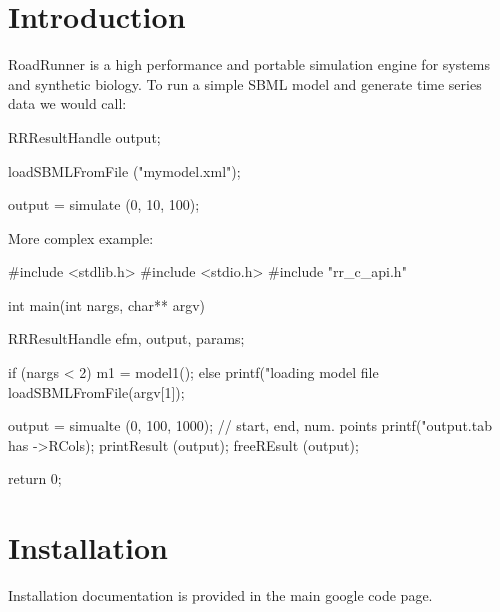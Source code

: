 \hypertarget{index_intro_sec}{}\section{\-Introduction}\label{index_intro_sec}
\-Road\-Runner is a high performance and portable simulation engine for systems and synthetic biology. \-To run a simple \-S\-B\-M\-L model and generate time series data we would call\-:


\begin{DoxyCode}
 RRResultHandle output;

 loadSBMLFromFile ("mymodel.xml");

 output = simulate (0, 10, 100);
\end{DoxyCode}


\-More complex example\-:


\begin{DoxyCode}
 #include <stdlib.h>
 #include <stdio.h>
 #include "rr_c_api.h"

 int main(int nargs, char** argv)
 {
        RRResultHandle efm, output, params;

        if (nargs < 2)
        {
            m1 = model1();
        }
        else
        {
            printf("loading model file %
            loadSBMLFromFile(argv[1]);
        }


        output = simualte (0, 100, 1000);  // start, end, num. points
        printf("output.tab has %
      ->RCols);
        printResult (output);
        freeREsult (output);

        return 0;
 }
\end{DoxyCode}
 \hypertarget{index_install_sec}{}\section{\-Installation}\label{index_install_sec}
\-Installation documentation is provided in the main google code page. 